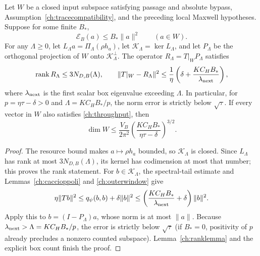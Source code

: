 \begin{theorem}
\label{ch:fulloutput}
Let $W$ be a closed input subspace satisfying passage and absolute bypass,
Assumption~\ref{ch:tracecompatibility}, and the preceding local Maxwell
hypotheses.  Suppose for some finite $B_*$,
\begin{equation}
 \mathcal E_B(a)\leq B_*\|a\|^2\qquad(a\in W).
 \label{ch:uniformresource}
\end{equation}
For any $\Lambda\geq0$, let
$L_\Lambda a=\Pi_\Lambda(\rho h_a)$, let
$\mathcal K_\Lambda=\ker L_\Lambda$, and let $P_\Lambda$ be the
orthogonal projection of $W$ onto $\mathcal K_\Lambda^\perp$.
The operator $R_\Lambda=T|_W P_\Lambda$ satisfies
\begin{equation}
 \operatorname{rank}R_\Lambda\leq3N_{D,B}(\Lambda),\qquad
 \|T|_W-R_\Lambda\|^2
 \leq\frac1\eta\left(\delta+
             \frac{K C_H B_*}{\lambda_{\rm next}}\right),
 \label{ch:fulloutputerror}
\end{equation}
where $\lambda_{\rm next}$ is the first scalar box eigenvalue exceeding
$\Lambda$.  In particular, for $p=\eta\tau-\delta>0$ and
$\Lambda=K C_HB_*/p$, the norm error is strictly below $\sqrt\tau$.
If every vector in $W$ also satisfies \eqref{ch:throughput}, then
\begin{equation}
 \dim W\leq\frac{V_B}{2\pi^2}
       \left(\frac{K C_HB_*}{\eta\tau-\delta}\right)^{3/2}.
 \label{ch:physicalcount}
\end{equation}
\end{theorem}
\begin{proof}
The resource bound makes $a\mapsto\rho h_a$ bounded, so
$\mathcal K_\Lambda$ is closed.  Since $L_\Lambda$ has rank at most
$3N_{D,B}(\Lambda)$, its kernel has codimension at most that number;
this proves the rank statement.  For $b\in\mathcal K_\Lambda$,
the spectral-tail estimate and Lemmas~\ref{ch:caccioppoli}
and \ref{ch:outerwindow} give
\begin{equation}
 \eta\|Tb\|^2\leq q_\psi(b,b)+\delta\|b\|^2
 \leq\left(\frac{K C_HB_*}{\lambda_{\rm next}}+\delta\right)\|b\|^2.
 \label{ch:kerneloutput}
\end{equation}
Apply this to $b=(I-P_\Lambda)a$, whose norm is at most $\|a\|$.
Because $\lambda_{\rm next}>\Lambda=K C_HB_*/p$, the error is
strictly below $\sqrt\tau$ (if $B_*=0$, positivity of $p$ already
precludes a nonzero counted subspace).  Lemma~\ref{ch:ranklemma} and
the explicit box count finish the proof.
\end{proof}

